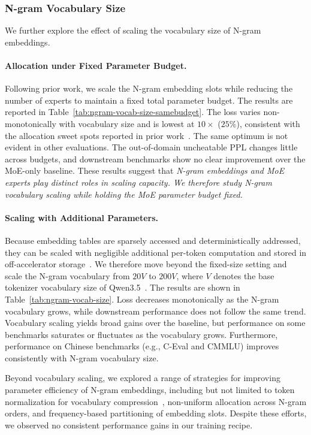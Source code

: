 \subsubsection{N-gram Vocabulary Size}
We further explore the effect of scaling the vocabulary size of N-gram embeddings.


\paragraph{Allocation under Fixed Parameter Budget.}
Following prior work, we scale the N-gram embedding slots while reducing the number of experts to maintain a fixed total parameter budget. 
The results are reported in Table~\ref{tab:ngram-vocab-size-samebudget}. 
The loss varies non-monotonically with vocabulary size and is lowest at $10\times$ ($25\%$), consistent with the allocation sweet spots reported in prior work~\citep{liu2026scalingembeddings,cheng2026engram}.
The same optimum is not evident in other evaluations. The out-of-domain uncheatable PPL changes little across budgets, and downstream benchmarks show no clear improvement over the MoE-only baseline.
These results suggest that \textit{N-gram embeddings and MoE experts play distinct roles in scaling capacity.
We therefore study N-gram vocabulary scaling while holding the MoE parameter budget fixed.}

\paragraph{Scaling with Additional Parameters.}


Because embedding tables are sparsely accessed and deterministically addressed, they can be scaled with negligible additional per-token computation and stored in off-accelerator storage~\citep{google2025gemma3n,cheng2026engram}.
We therefore move beyond the fixed-size setting and scale the N-gram vocabulary from $20V$ to $200V$, where $V$ denotes the base tokenizer vocabulary size of Qwen3.5~\citep{qwenteam2026qwen35}.
The results are shown in Table~\ref{tab:ngram-vocab-size}.
Loss decreases monotonically as the N-gram vocabulary grows, while downstream performance does not follow the same trend.
Vocabulary scaling yields broad gains over the baseline, but performance on some benchmarks saturates or fluctuates as the vocabulary grows.
Furthermore, performance on Chinese benchmarks (e.g., C-Eval and CMMLU) improves consistently with N-gram vocabulary size.

Beyond vocabulary scaling, we explored a range of strategies for improving parameter efficiency of N-gram embeddings, including but not limited to token normalization for vocabulary compression~\citep{cheng2026engram}, non-uniform allocation across N-gram orders, and frequency-based partitioning of embedding slots.
Despite these efforts, we observed no consistent performance gains in our training recipe.

